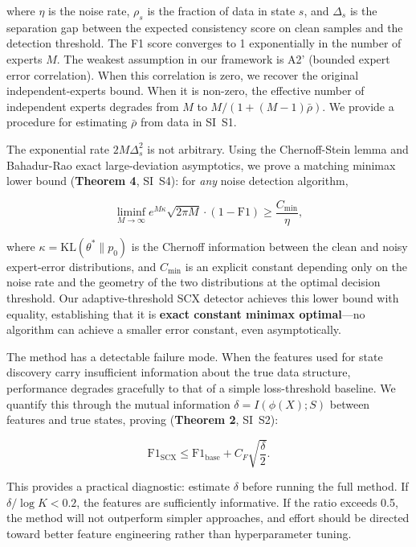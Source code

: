 where $\eta$ is the noise rate, $\rho_s$ is the fraction of data in state $s$, and $\Delta_s$ is the separation gap between the expected consistency score on clean samples and the detection threshold. The F1 score converges to 1 exponentially in the number of experts $M$. The weakest assumption in our framework is A2' (bounded expert error correlation). When this correlation is zero, we recover the original independent-experts bound. When it is non-zero, the effective number of independent experts degrades from $M$ to $M/(1+(M-1)\bar{\rho})$. We provide a procedure for estimating $\bar{\rho}$ from data in SI~S1.

The exponential rate $2M\Delta_s^2$ is not arbitrary. Using the Chernoff-Stein lemma and Bahadur-Rao exact large-deviation asymptotics, we prove a matching minimax lower bound (\textbf{Theorem 4}, SI~S4): for \emph{any} noise detection algorithm,

\begin{equation}
\liminf_{M\to\infty} e^{M\kappa} \sqrt{2\pi M} \cdot (1 - \mathrm{F1}) \geq \frac{C_{\min}}{\eta},
\end{equation}

where $\kappa = \mathrm{KL}(\theta^* \| p_0)$ is the Chernoff information between the clean and noisy expert-error distributions, and $C_{\min}$ is an explicit constant depending only on the noise rate and the geometry of the two distributions at the optimal decision threshold. Our adaptive-threshold SCX detector achieves this lower bound with equality, establishing that it is \textbf{exact constant minimax optimal}---no algorithm can achieve a smaller error constant, even asymptotically.

The method has a detectable failure mode. When the features used for state discovery carry insufficient information about the true data structure, performance degrades gracefully to that of a simple loss-threshold baseline. We quantify this through the mutual information $\delta = I(\phi(X); S)$ between features and true states, proving (\textbf{Theorem 2}, SI~S2):

\begin{equation}
\mathrm{F1}_{\mathrm{SCX}} \leq \mathrm{F1}_{\mathrm{base}} + C_F \sqrt{\frac{\delta}{2}}.
\end{equation}

This provides a practical diagnostic: estimate $\delta$ before running the full method. If $\delta / \log K < 0.2$, the features are sufficiently informative. If the ratio exceeds 0.5, the method will not outperform simpler approaches, and effort should be directed toward better feature engineering rather than hyperparameter tuning.

